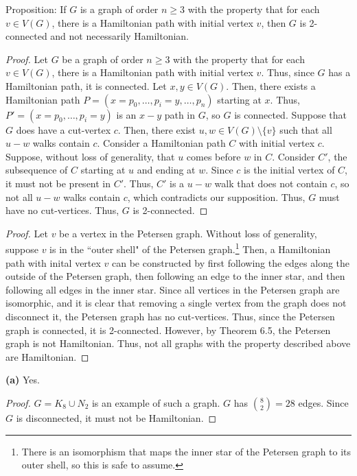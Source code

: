 \documentclass[12pt]{article}
\begin{document}
\newpage{} Proposition: If $G$ is a graph of order $n \geq 3$ with the property that for each $v \in V(G)$, there is a Hamiltonian path with initial vertex $v$, then $G$ is 2-connected and not necessarily Hamiltonian.
\begin{proof}
	Let $G$ be a graph of order $n \geq 3$ with the property that for each $v \in V(G)$, there is a Hamiltonian path with initial vertex $v$.
	Thus, since $G$ has a Hamiltonian path, it is connected.
	Let $x, y \in V(G)$.
	Then, there exists a Hamiltonian path $P = (x = p_0, \hdots, p_i = y, \hdots, p_n)$ starting at $x$.
	Thus, $P' = (x = p_0, \hdots, p_i = y)$ is an $x-y$ path in $G$, so $G$ is connected.
	Suppose that $G$ does have a cut-vertex $c$.
	Then, there exist $u,w \in V(G) \setminus \{v\}$ such that all $u-w$ walks contain $c$.
	Consider a Hamiltonian path $C$ with initial vertex $c$.
	Suppose, without loss of generality, that $u$ comes before $w$ in $C$.
	Consider $C'$, the subsequence of $C$ starting at $u$ and ending at $w$.
	Since $c$ is the initial vertex of $C$, it must not be present in $C'$.
	Thus, $C'$ is a $u-w$ walk that does not contain $c$, so not all $u-w$ walks contain $c$, which contradicts our supposition.
	Thus, $G$ must have no cut-vertices.
	Thus, $G$ is 2-connected.
\end{proof}
\begin{proof}
	Let $v$ be a vertex in the Petersen graph.
	Without loss of generality, suppose $v$ is in the ``outer shell" of the Petersen graph.\footnote{There is an isomorphism that maps the inner star of the Petersen graph to its outer shell, so this is safe to assume.}
	Then, a Hamiltonian path with inital vertex $v$ can be constructed by first following the edges along the outside of the Petersen graph, then following an edge to the inner star, and then following all edges in the inner star.
	Since all vertices in the Petersen graph are isomorphic, and it is clear that removing a single vertex from the graph does not disconnect it, the Petersen graph has no cut-vertices.
	Thus, since the Petersen graph is connected, it is 2-connected.
	However, by Theorem 6.5, the Petersen graph is not Hamiltonian.
	Thus, not all graphs with the property described above are Hamiltonian.
\end{proof}

\newpage{}

	{\bf (a)} Yes.
	\begin{proof}
		$G = K_8 \cup N_2$ is an example of such a graph.
		$G$ has ${8 \choose 2} = 28$ edges.
		Since $G$ is disconnected, it must not be Hamiltonian.
	\end{proof}
\end{document}
